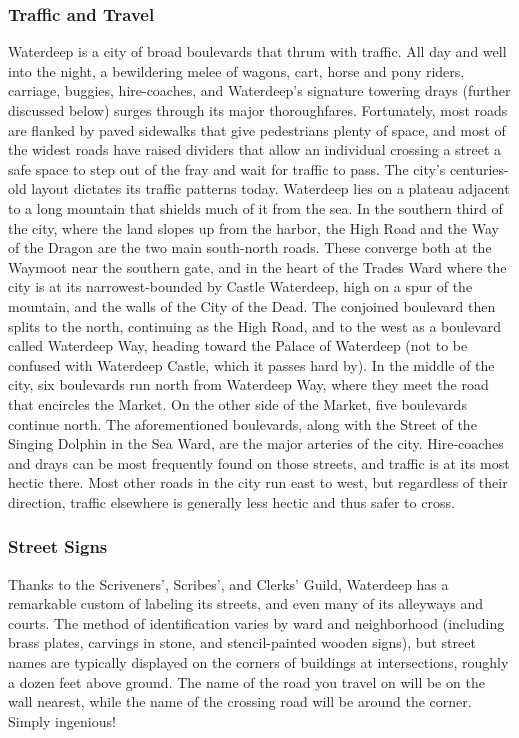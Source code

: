 \documentclass[10pt,a4paper,twoside,twocolumn,openany,nodeprecatedcode]{dndbook}
\begin{document}
\subsubsection{Traffic and Travel}
Waterdeep is a city of broad boulevards that thrum with traffic. All day and well into the night, a bewildering melee of wagons, cart, horse and pony riders, carriage, buggies, hire-coaches, and Waterdeep's signature towering drays (further discussed below) surges through its major thoroughfares. Fortunately, most roads are flanked by paved sidewalks that give pedestrians plenty of space, and most of the widest roads have raised dividers that allow an individual crossing a street a safe space to step out of the fray and wait for traffic to pass.
The city's centuries-old layout dictates its traffic patterns today. Waterdeep lies on a plateau adjacent to a long mountain that shields much of it from the sea. In the southern third of the city, where the land slopes up from the harbor, the High Road and the Way of the Dragon are the two main south-north roads. These converge both at the Waymoot near the southern gate, and in the heart of the Trades Ward where the city is at its narrowest-bounded by Castle Waterdeep, high on a spur of the mountain, and the walls of the City of the Dead. The conjoined boulevard then splits to the north, continuing as the High Road, and to the west as a boulevard called Waterdeep Way, heading toward the Palace of Waterdeep (not to be confused with Waterdeep Castle, which it passes hard by). In the middle of the city, six boulevards run north from Waterdeep Way, where they meet the road that encircles the Market. On the other side of the Market, five boulevards continue north.
The aforementioned boulevards, along with the Street of the Singing Dolphin in the Sea Ward, are the major arteries of the city. Hire-coaches and drays can be most frequently found on those streets, and traffic is at its most hectic there. Most other roads in the city run east to west, but regardless of their direction, traffic elsewhere is generally less hectic and thus safer to cross.
\subsubsection{Street Signs}
Thanks to the Scriveners', Scribes', and Clerks' Guild, Waterdeep has a remarkable custom of labeling its streets, and even many of its alleyways and courts. The method of identification varies by ward and neighborhood (including brass plates, carvings in stone, and stencil-painted wooden signs), but street names are typically displayed on the corners of buildings at intersections, roughly a dozen feet above ground. The name of the road you travel on will be on the wall nearest, while the name of the crossing road will be around the corner. Simply ingenious!
\end{document}
